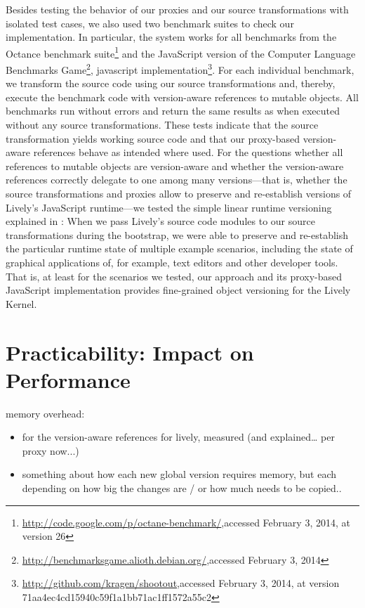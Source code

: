 Besides testing the behavior of our proxies and our source transformations with isolated test cases, we also used two benchmark suites to check our implementation.
In particular, the system works for all benchmarks from the Octance benchmark suite\footnote{\url{http://code.google.com/p/octane-benchmark/},\goodbreak accessed February 3, 2014, at version 26} and the JavaScript version of the Computer Language Benchmarks Game\footnote{\url{http://benchmarksgame.alioth.debian.org/},\goodbreak accessed February 3, 2014}, javascript implementation\footnote{\url{http://github.com/kragen/shootout},\goodbreak accessed February 3, 2014, at version 71aa4ec4cd15940c59f1a1bb71ac1ff1572a55c2}.
For each individual benchmark, we transform the source code using our source transformations and, thereby, execute the benchmark code with version-aware references to mutable objects.
All benchmarks run without errors and return the same results as when executed without any source transformations.
These tests indicate that the source transformation yields working source code and that our proxy-based version-aware references behave as intended where used.
For the questions whether all references to mutable objects are version-aware and whether the version-aware references correctly delegate to one among many versions---that is, whether the source transformations and proxies allow to preserve and re-establish versions of Lively's JavaScript runtime---we tested the simple linear runtime versioning explained in :
When we pass Lively's source code modules to our source transformations during the bootstrap, we were able to preserve and re-establish the particular runtime state of multiple example scenarios, including the state of graphical applications of, for example, text editors and other developer tools.
That is, at least for the scenarios we tested, our approach and its proxy-based JavaScript implementation provides fine-grained object versioning for the Lively Kernel.


\section{Practicability: Impact on Performance}

memory overhead:
\begin{itemize}
    \item for the version-aware references for lively, measured (and explained… per proxy now...)
    \item something about how each new global version requires memory, but each depending on how big the changes are / or how much needs to be copied..
\end{itemize}


